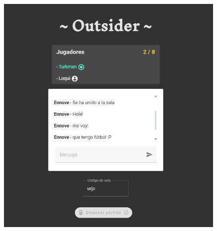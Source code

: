 \begin{figure}[h]
   \centering
   \begin{minipage}{0.45\textwidth}
	\centering
	  \includegraphics[clip=true,width=\textwidth]{res_lobby2.png}\\
   \end{minipage}
   \hfill
   \begin{minipage}{0.45\textwidth}
	\centering

\end{minipage}
\end{figure}
